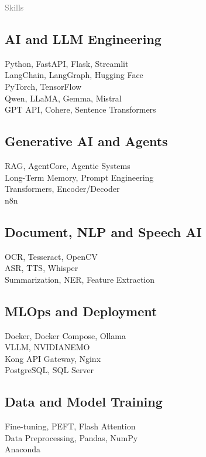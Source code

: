 \documentclass[a4paper]{deedy-resume}
\begin{document}
\hfill
\begin{minipage}[t]{0.33\textwidth}
\small

\textcolor{gray}{\huge{Skills}}
\vspace{\itemsep}

\subsection*{AI and LLM Engineering}
Python, FastAPI, Flask, Streamlit \\
LangChain, LangGraph, Hugging Face \\
PyTorch, TensorFlow \\
Qwen, LLaMA, Gemma, Mistral \\
GPT API, Cohere, Sentence Transformers \\

\subsection*{Generative AI and Agents}
RAG, AgentCore, Agentic Systems \\
Long-Term Memory, Prompt Engineering \\
Transformers, Encoder/Decoder \\
n8n \\

\subsection*{Document, NLP and Speech AI}
OCR, Tesseract, OpenCV \\
ASR, TTS, Whisper \\
Summarization, NER, Feature Extraction \\

\subsection*{MLOps and Deployment}
Docker, Docker Compose, Ollama \\
VLLM, NVIDIA\texttrademark NEMO \\
Kong API Gateway, Nginx \\
PostgreSQL, SQL Server \\

\subsection*{Data and Model Training}
Fine-tuning, PEFT, Flash Attention \\
Data Preprocessing, Pandas, NumPy \\
Anaconda \\


\end{minipage}
\end{document}
